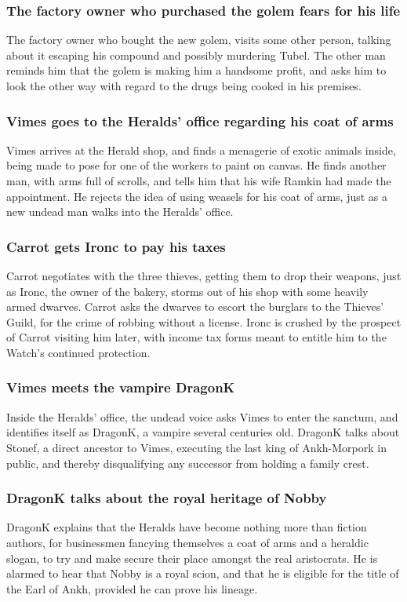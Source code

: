\subsubsection{The factory owner who purchased the golem fears for his life}
The factory owner who bought the new golem, visits some other person, talking about it escaping his
compound and possibly murdering \Gls{Tubel}. The other man reminds him that the golem is making him
a handsome profit, and asks him to look the other way with regard to the drugs being cooked in his
premises.

\subsubsection{\Gls{Vimes} goes to the Heralds' office regarding his coat of arms}
\Gls{Vimes} arrives at the Herald shop, and finds a menagerie of exotic animals inside, being made
to pose for one of the workers to paint on canvas. He finds another man, with arms full of scrolls,
and tells him that his wife \Gls{Ramkin} had made the appointment. He rejects the idea of using
weasels for his coat of arms, just as a new undead man walks into the Heralds' office.

\subsubsection{\Gls{Carrot} gets \Gls{Ironc} to pay his taxes}
\Gls{Carrot} negotiates with the three thieves, getting them to drop their weapons, just as
\Gls{Ironc}, the owner of the bakery, storms out of his shop with some heavily armed dwarves.
\Gls{Carrot} asks the dwarves to escort the burglars to the Thieves' Guild, for the crime of robbing
without a license. \Gls{Ironc} is crushed by the prospect of \Gls{Carrot} visiting him later, with
income tax forms meant to entitle him to the Watch's continued protection.

\subsubsection{\Gls{Vimes} meets the vampire \Gls{DragonK}}
Inside the Heralds' office, the undead voice asks \Gls{Vimes} to enter the sanctum, and identifies
itself as \Gls{DragonK}, a vampire several centuries old. \Gls{DragonK} talks about \Gls{Stonef},
a direct ancestor to \Gls{Vimes}, executing the last king of Ankh-Morpork in public, and thereby
disqualifying any successor from holding a family crest.

\subsubsection{\Gls{DragonK} talks about the royal heritage of \Gls{Nobby}}
\Gls{DragonK} explains that the Heralds have become nothing more than fiction authors, for
businessmen fancying themselves a coat of arms and a heraldic slogan, to try and make secure their
place amongst the real aristocrats. He is alarmed to hear that \Gls{Nobby} is a royal scion, and
that he is eligible for the title of the Earl of Ankh, provided he can prove his lineage.

